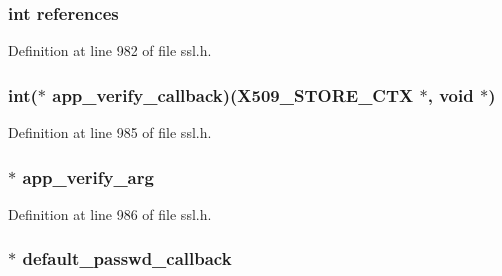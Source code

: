 \subsubsection[{\texorpdfstring{references}{references}}]{\setlength{\rightskip}{0pt plus 5cm}int references}\hypertarget{structssl__ctx__st_a146fdb34d9a909e530adf8b189481195}{}\label{structssl__ctx__st_a146fdb34d9a909e530adf8b189481195}


Definition at line 982 of file ssl.\+h.

\subsubsection[{\texorpdfstring{app\+\_\+verify\+\_\+callback}{app_verify_callback}}]{\setlength{\rightskip}{0pt plus 5cm}int($\ast$ app\+\_\+verify\+\_\+callback)({\bf X509\+\_\+\+S\+T\+O\+R\+E\+\_\+\+C\+TX} $\ast$, {\bf void} $\ast$)}\hypertarget{structssl__ctx__st_acf39a606edc5bb575216bc7bec28b926}{}\label{structssl__ctx__st_acf39a606edc5bb575216bc7bec28b926}


Definition at line 985 of file ssl.\+h.

\subsubsection[{\texorpdfstring{app\+\_\+verify\+\_\+arg}{app_verify_arg}}]{ $\ast$ app\+\_\+verify\+\_\+arg}\hypertarget{structssl__ctx__st_aa6f37e529d7ccf39c110549b5d645275}{}\label{structssl__ctx__st_aa6f37e529d7ccf39c110549b5d645275}


Definition at line 986 of file ssl.\+h.

\subsubsection[{\texorpdfstring{default\+\_\+passwd\+\_\+callback}{default_passwd_callback}}]{ $\ast$ default\+\_\+passwd\+\_\+callback}\hypertarget{structssl__ctx__st_a8dc0d25dca9a3f4ab7cdd3505f61a6eb}{}\label{structssl__ctx__st_a8dc0d25dca9a3f4ab7cdd3505f61a6eb}


